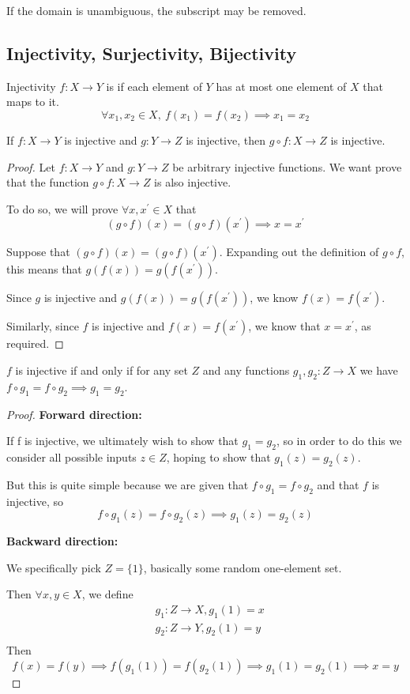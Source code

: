 \begin{notation}
If the domain is unambiguous, the subscript may be removed.
\end{notation}
\pagebreak

\subsection{Injectivity, Surjectivity, Bijectivity}
\begin{defn}{Injectivity}{}
$f:X\to Y$ is  if each element of $Y$ has at most one element of $X$ that maps to it.
\[ \forall x_1,x_2\in X,\:f(x_1)=f(x_2) \implies x_1=x_2 \]
\end{defn}

\begin{proposition}
If $f:X \to Y$ is injective and $g:Y \to Z$ is injective, then $g \circ f:X \to Z$ is injective.
\end{proposition}
\begin{proof}
Let $f:X \to Y$ and $g:Y \to Z$ be arbitrary injective functions. We want prove that the function $g \circ f:X \to Z$ is also injective.

To do so, we will prove $\forall x,x^\prime \in X$ that 
\[ (g \circ f)(x) = (g \circ f)(x^\prime) \implies x=x^\prime \]

Suppose that $(g \circ f)(x) = (g \circ f)(x^\prime)$. Expanding out the definition of $g \circ f$, this means that $g(f(x)) = g(f(x^\prime))$.

Since $g$ is injective and $g(f(x)) = g(f(x^\prime))$, we know $f(x)=f(x^\prime)$.

Similarly, since $f$ is injective and $f(x) = f(x^\prime)$, we know that $x=x^\prime$, as required.
\end{proof}

\begin{proposition}
$f$ is injective if and only if for any set $Z$ and any functions $g_1,g_2:Z\to X$ we have $f\circ g_1=f\circ g_2 \implies g_1=g_2$.
\end{proposition}
\begin{proof}
\textbf{Forward direction:}

If f is injective, we ultimately wish to show that $g_1=g_2$, so in order to do this we consider all possible inputs $z \in Z$, hoping to show that $g_1(z)=g_2(z)$.

But this is quite simple because we are given that $f\circ g_1=f\circ g_2$ and that $f$ is injective, so
\[ f \circ g_1(z)=f \circ g_2(z) \implies g_1(z)=g_2(z) \]

\textbf{Backward direction:}

We specifically pick $Z=\{1\}$, basically some random one-element set.

Then $\forall x,y \in X$, we define
\begin{align*}
& g_1:Z \to X, g_1(1)=x \\
& g_2:Z \to Y, g_2(1)=y \\
\end{align*}
Then
\[ f(x)=f(y) \implies f(g_1(1))=f(g_2(1)) \implies g_1(1)=g_2(1) \implies x=y \]
\end{proof}

